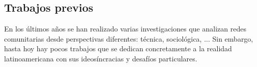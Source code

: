 
\begin{comment}
\noindent \emph{Welche Ziele werden mit der Arbeit verfolgt? Welche zentralen Fragen lassen sich daraus ableiten?}
	Die Ziele sollten so spezifisch wie möglich sein. Das hilft Ihnen im Verlauf der Umsetzung zu prüfen, ob Sie Ihre Ziele erreichen konnten. Bitte achten Sie darauf, dass die gesetzten Ziele realistisch sind und das Sie in der Lage sind, das erfolgreiche Erreichen dieser Ziele im Bereich Evaluation zu prüfen.
  \end{comment}


\begin{comment}
* análisis: ciberoptimismo al nivel físico de las redes/al nivel social de la organización de los grupos
\end{comment}


\begin{comment}
La noción ``Redes'' tiene sentidos multiples:
* redes sociales, en el sentido de grupos de gente y las relaciones entre ellxs
* redes sociales, en el sentido de herramientas y aplicaciones digitales que permiten que la gente se relacione de cierta manera en el ámbito digital
* redes en el sentido de la ANT: un modelo abstracto para observar interacción y redistribución de relaciones/recursos/poder; permiten hacer zoom in and out
* redes como infraestructura física: cables, computadoras, antenas, routers <-- un requisito para las demás capas/la mayoría de los sentidos
** también redes sociales de gente (en un sentido amplio: gente organizada/estructurada de cierta manera) que decide/construye y mantiene la infraestructura física.
--> potencial conflictivo enorme: lxs que/quienes controlan la infraestructura, controlan la comunicación y tienen un poder enorme
\end{comment}

\subsection{Trabajos previos}

En los últimos años se han realizado varias investigaciones que analizan redes comunitarias desde perspectivas diferentes: técnica, sociológica, ...
Sin embargo, hasta hoy hay pocos trabajos que se dedican concretamente a la realidad latinoamericana con sus ideosíncracias y desafíos particulares.

